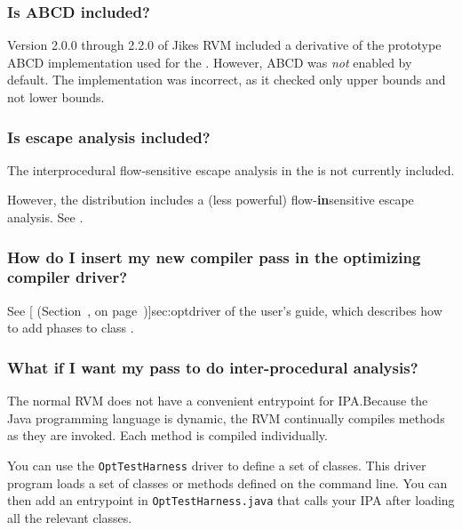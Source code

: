 \subsubsection{Is ABCD included?}
Version 2.0.0 through 2.2.0 of Jikes RVM included a derivative of the
prototype ABCD implementation used for the .  However, ABCD was {\em not} enabled by default.
The implementation was incorrect, as it checked only upper
bounds and not lower bounds. 

\subsubsection{Is escape analysis included?}

The interprocedural flow-sensitive escape analysis in the 
 is not currently included.

However, the distribution includes a (less powerful) flow-{\bf in}\-sen\-si\-tive
escape analysis.  See  
.

\subsubsection{How do I insert my new compiler pass in the optimizing
compiler driver?}

See [
  (Section~\Ref, on page~\Pageref)]{sec:optdriver} of the user's guide, which describes how to
add phases to class 
.

\subsubsection{What if I want my pass to do inter-procedural analysis?}

The normal RVM does not have a convenient entrypoint for IPA.\@  Because the
Java programming language is
dynamic, the RVM continually compiles methods as they are
invoked.  Each method is compiled individually.

You can use the {\tt OptTestHarness} driver to define a set of classes. 
This driver program loads a set of classes or methods defined on the
command line.  You can then add an entrypoint in {\tt OptTestHarness.java}
that calls your IPA after loading all the relevant classes.

